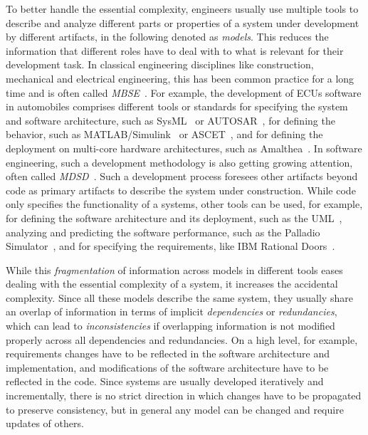 To better handle the essential complexity, engineers usually use multiple tools to describe and analyze different parts or properties of a system under development by different artifacts, in the following denoted as \emph{models}.
This reduces the information that different roles have to deal with to what is relevant for their development task.
In classical engineering disciplines like construction, mechanical and electrical engineering, this has been common practice for a long time and is often called \emph{\gls{MBSE}}~\cite{estefan2007MbseSurvey}.
For example, the development of \glspl{ECU} software in automobiles comprises different tools or standards for specifying the system and software architecture, such as SysML~\cite{sysml} or AUTOSAR~\cite{scheid2015autosar}, for defining the behavior, such as MATLAB/Simulink~\cite{simulink} or ASCET~\cite{ascet}, and for defining the deployment on multi-core hardware architectures, such as Amalthea~\cite{amalthea, wolff2014a}.
In software engineering, such a development methodology is also getting growing attention, often called \emph{\gls{MDSD}}~\cite{stahl2006a}.
Such a development process foresees other artifacts beyond code as primary artifacts to describe the system under construction.
While code only specifies the functionality of a systems, other tools can be used, for example, for defining the software architecture and its deployment, such as the \gls{UML}~\cite{uml}, analyzing and predicting the software performance, such as the Palladio Simulator~\cite{reussner2016a}, and for specifying the requirements, like IBM Rational Doors~\cite{laplante2012RequirementsEngineering-Book}.

While this \emph{fragmentation} of information across models in different tools eases dealing with the essential complexity of a system, it increases the accidental complexity.
Since all these models describe the same system, they usually share an overlap of information in terms of implicit \emph{dependencies} or \emph{redundancies}, which can lead to \emph{inconsistencies} if overlapping information is not modified properly across all dependencies and redundancies.
On a high level, for example, requirements changes have to be reflected in the software architecture and implementation, and modifications of the software architecture have to be reflected in the code.
Since systems are usually developed iteratively and incrementally, there is no strict direction in which changes have to be propagated to preserve consistency, but in general any model can be changed and require updates of others.

